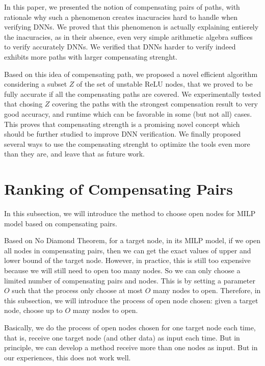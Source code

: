 \documentclass{llncs}
\begin{document}
In this paper, we presented the notion of compensating pairs of paths, with rationale why such a phenomenon creates inacuracies hard to handle when verifying DNNs. We proved that this phenomenon is actually explaining entierely the inacuracies, as in their absence, even very simple arithmetic algebra suffices to verify accurately DNNs. We verified that DNNs harder to verify indeed exhibits more paths with larger compensating strenght. 

Based on this idea of compensating path, we proposed a novel efficient algorithm considering a subset $Z$ of the set of unstable ReLU nodes, that we proved to be fully accurate if all the compensating paths are covered. We experimentally tested that chosing $Z$ covering the paths with the strongest compensation result to very good accuracy, and runtime which can be favorable in some (but not all) cases. 
This proves that compensating strength is a promising novel concept which should be further studied to 
improve DNN verification. We finally proposed several ways to use the compensating strenght to optimize the tools even more than they are, and leave that as future work.

\newpage




\newpage

\appendix

\section{Ranking of Compensating Pairs}

In this subsection, we will introduce the method to choose open nodes for MILP model based on compensating pairs.

Based on No Diamond Theorem, for a target node, in its MILP model, if we open all nodes in compensating pairs, then we can get the exact values of upper and lower bound of the target node. However, in practice, this is still too expensive because we will still need to open too many nodes. So we can only choose a limited number of compensating pairs and nodes. This is by setting a parameter $O$ such that the process only choose at most $O$ many nodes to open. Therefore, in this subsection, we will introduce the process of open node chosen: given a target node, choose up to $O$ many nodes to open.


Basically, we do the process of open nodes chosen for one target node each time, that is, receive one target node (and other data) as input each time. But in principle, we can develop a method receive more than one nodes as input. But in our experiences, this does not work well.  
\end{document}
